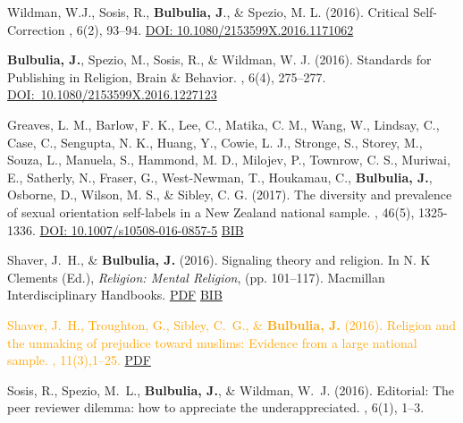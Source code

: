 \documentclass{article}
\begin{document}
\begin{thebibliography}{99}

Wildman, W.J., Sosis, R., {\bf Bulbulia, J}., \& Spezio, M. L. (2016).
\newblock Critical Self-Correction
, 6(2), 93--94. 
\href{https://doi.org/10.1080/2153599X.2016.1171062}{DOI: 10.1080/2153599X.2016.1171062}


{\bf Bulbulia, J.}, Spezio, M., Sosis, R., \& Wildman, W. J.  (2016).
\newblock Standards for Publishing in Religion, Brain \& Behavior.
, 6(4), 275--277. 
\href{http://dx.doi.org/10.1080/2153599X.2016.1227123}{DOI:~10.1080/2153599X.2016.1227123 }


Greaves, L. M., Barlow, F. K., Lee, C., Matika, C. M., Wang, W., Lindsay, C., Case, C., Sengupta, N. K., Huang, Y., Cowie, L. J., Stronge, S., Storey, M., Souza, L., Manuela, S., Hammond, M. D., Milojev, P., Townrow, C. S., Muriwai, E.,  Satherly, N.,   Fraser, G., West-Newman, T., Houkamau, C., {\bf Bulbulia, J.},  Osborne, D., Wilson, M. S., \& Sibley, C. G. (2017). 			
\newblock The diversity and prevalence of sexual orientation self-labels in a New Zealand national sample.									
, 46(5), 1325-1336. 												 
\href{https://doi.org/10.1007/s10508-016-0857-5}{DOI: 10.1007/s10508-016-0857-5}
\href{https://www.dropbox.com/s/gj05gm54am7tos7/2016.sxorient.bib?dl=0}{BIB}


Shaver, J.~H., \& {\bf Bulbulia, J.} (2016).
\newblock Signaling theory and religion.
\newblock In N. K Clements (Ed.), {\em Religion: Mental Religion}, (pp. 101--117). Macmillan
  Interdisciplinary Handbooks. 
\href{https://www.dropbox.com/s/3csna1dy4vbib92/Signaling_Theory_and_Religion.pdf?dl=0}{PDF} \href{https://www.dropbox.com/s/p4b2hzshwuk2q9u/2016.Sh.bul.STR.bib?dl=0}{BIB}


\textcolor{Orange}{Shaver, J.~H., Troughton, G., Sibley, C.~G., \& {\bf Bulbulia, J.} (2016).
\newblock Religion and the unmaking of prejudice toward muslims: Evidence from
  a large national sample.
, 11(3),1--25.}
\href{https://www.dropbox.com/s/jw4r962hchojfvr/journal.pone.0150209.PDF?dl=0}{PDF} %


Sosis, R., Spezio, M.~L., {\bf Bulbulia, J.}, \& Wildman, W.~J. (2016). Editorial:
\newblock The peer reviewer dilemma: how to appreciate the underappreciated.
, 6(1), 1--3. 



\end{thebibliography}
\end{document}
